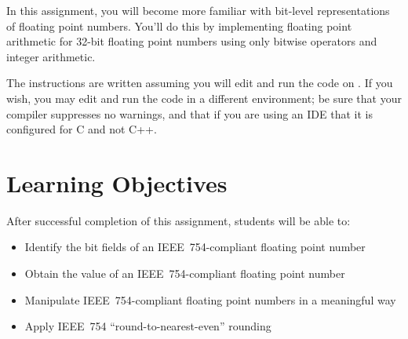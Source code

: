\usepackage{listings}




\renewcommand{\labnumber}{\floatlabnumber}
\renewcommand{\labname}{Floating Point Representation and Arithmetic Lab}
\renewcommand{\shortlabname}{floatlab}
\renewcommand{\collaborationrules}{\floatlabcollaboration}
\renewcommand{\duedate}{\floatlabdue}

\pagelayout

    \labidentifier

    In this assignment, you will become more familiar with bit-level representations of floating point numbers.
    You'll do this by implementing floating point arithmetic for 32-bit floating point numbers using only bitwise operators and integer arithmetic.

    The instructions are written assuming you will edit and run the code on \runtimeenvironment.
    If you wish, you may edit and run the code in a different environment;
    be sure that your compiler suppresses no warnings, and that if you are using an IDE that it is configured for C and not C++.

    \section*{Learning Objectives}

    After successful completion of this assignment, students will be able to:
    \begin{itemize}
        \item Identify the bit fields of an IEEE~754-compliant floating point number
        \item Obtain the value of an IEEE~754-compliant floating point number
        \item Manipulate IEEE~754-compliant floating point numbers in a meaningful way
        \item Apply IEEE~754 ``round-to-nearest-even'' rounding
    \end{itemize}

